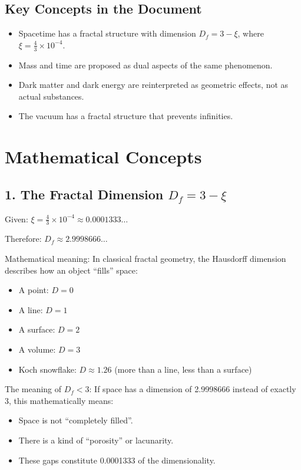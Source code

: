 	\subsection{Key Concepts in the Document}
	\begin{itemize}
		\item Spacetime has a fractal structure with dimension \( D_f = 3 - \xi \), where \( \xi = \frac{4}{3} \times 10^{-4} \).
		\item Mass and time are proposed as dual aspects of the same phenomenon.
		\item Dark matter and dark energy are reinterpreted as geometric effects, not as actual substances.
		\item The vacuum has a fractal structure that prevents infinities.
	\end{itemize}
	
	\section{Mathematical Concepts}
	
	\subsection{1. The Fractal Dimension \( D_f = 3 - \xi \)}
	Given: \( \xi = \frac{4}{3} \times 10^{-4} \approx 0.0001333\ldots \)
	
	Therefore: \( D_f \approx 2.9998666\ldots \)
	
	Mathematical meaning:
	In classical fractal geometry, the Hausdorff dimension describes how an object ``fills'' space:
	\begin{itemize}
		\item A point: \( D = 0 \)
		\item A line: \( D = 1 \)
		\item A surface: \( D = 2 \)
		\item A volume: \( D = 3 \)
		\item Koch snowflake: \( D \approx 1.26 \) (more than a line, less than a surface)
	\end{itemize}
	
	The meaning of \( D_f < 3 \):
	If space has a dimension of 2.9998666 instead of exactly 3, this mathematically means:
	\begin{itemize}
		\item Space is not ``completely filled''.
		\item There is a kind of ``porosity'' or lacunarity.
		\item These gaps constitute 0.0001333 of the dimensionality.
	\end{itemize}
	
